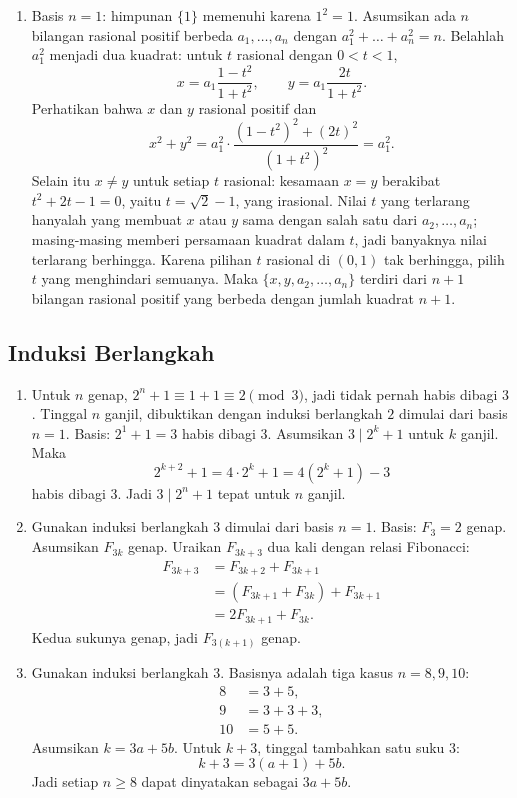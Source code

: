 \documentclass[12pt]{scrartcl}
\begin{document}
\begin{enumerate}
	\item Basis $n = 1$: himpunan $\{1\}$ memenuhi karena $1^2 = 1$.
	Asumsikan ada $n$ bilangan rasional positif berbeda $a_1, \dots, a_n$
	dengan $a_1^2 + \dots + a_n^2 = n$.
	Belahlah $a_1^2$ menjadi dua kuadrat: untuk $t$ rasional dengan $0 < t < 1$,
	\[ x = a_1\frac{1-t^2}{1+t^2}, \qquad
	y = a_1\frac{2t}{1+t^2}. \]
	Perhatikan bahwa $x$ dan $y$ rasional positif dan
	\[ x^2 + y^2 = a_1^2 \cdot \frac{(1-t^2)^2 + (2t)^2}{(1+t^2)^2} = a_1^2. \]
	Selain itu $x \ne y$ untuk setiap $t$ rasional:
	kesamaan $x = y$ berakibat $t^2 + 2t - 1 = 0$,
	yaitu $t = \sqrt{2} - 1$, yang irasional.
	Nilai $t$ yang terlarang hanyalah yang membuat $x$ atau $y$
	sama dengan salah satu dari $a_2, \dots, a_n$;
	masing-masing memberi persamaan kuadrat dalam $t$,
	jadi banyaknya nilai terlarang berhingga.
	Karena pilihan $t$ rasional di $(0,1)$ tak berhingga,
	pilih $t$ yang menghindari semuanya.
	Maka $\{x, y, a_2, \dots, a_n\}$ terdiri dari $n+1$ bilangan
	rasional positif yang berbeda dengan jumlah kuadrat $n+1$.

\end{enumerate}

\subsection{Induksi Berlangkah}

\begin{enumerate}[resume]
	\item Untuk $n$ genap, $2^n + 1 \equiv 1 + 1 \equiv 2 \pmod{3}$,
	jadi tidak pernah habis dibagi $3$.
	Tinggal $n$ ganjil, dibuktikan dengan induksi berlangkah $2$
	dimulai dari basis $n = 1$.
	Basis: $2^1 + 1 = 3$ habis dibagi $3$.
	Asumsikan $3 \mid 2^k + 1$ untuk $k$ ganjil. Maka
	\[ 2^{k+2} + 1 = 4 \cdot 2^k + 1 = 4(2^k + 1) - 3 \]
	habis dibagi $3$.
	Jadi $3 \mid 2^n + 1$ tepat untuk $n$ ganjil.

	\item Gunakan induksi berlangkah $3$ dimulai dari basis $n = 1$.
	Basis: $F_3 = 2$ genap.
	Asumsikan $F_{3k}$ genap.
	Uraikan $F_{3k+3}$ dua kali dengan relasi Fibonacci:
	\begin{align*}
	F_{3k+3} &= F_{3k+2} + F_{3k+1} \\
	&= (F_{3k+1} + F_{3k}) + F_{3k+1} \\
	&= 2F_{3k+1} + F_{3k}.
	\end{align*}
	Kedua sukunya genap, jadi $F_{3(k+1)}$ genap.

	\item Gunakan induksi berlangkah $3$.
	Basisnya adalah tiga kasus $n = 8, 9, 10$:
	\begin{align*}
	8 &= 3 + 5, \\
	9 &= 3 + 3 + 3, \\
	10 &= 5 + 5.
	\end{align*}
	Asumsikan $k = 3a + 5b$.
	Untuk $k+3$, tinggal tambahkan satu suku $3$:
	\[ k + 3 = 3(a+1) + 5b. \]
	Jadi setiap $n \ge 8$ dapat dinyatakan sebagai $3a + 5b$.

\end{enumerate}
\end{document}
